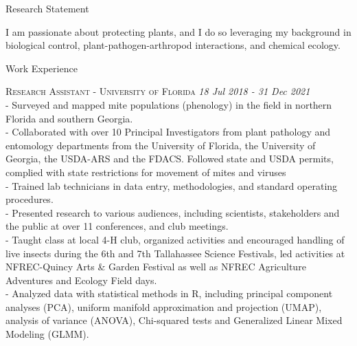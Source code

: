 \documentclass{resume} %
\begin{document}
\begin{rSection}{Research Statement}
	
I am passionate about protecting plants, and I do so leveraging my background in biological control, plant-pathogen-arthropod interactions, and chemical ecology. \end{rSection}

\begin{rSection}{Work Experience}
	
	\textsc{Research Assistant - University of Florida} \hfill {\em \textit{18 Jul 2018 - 31 Dec 2021}}\\
- Surveyed and mapped mite populations (phenology) in the field in northern Florida and southern Georgia.\\
- Collaborated with over 10 Principal Investigators from plant pathology and entomology departments from the University of Florida, the University of Georgia, the USDA-ARS and the FDACS. Followed state and USDA permits, complied with state restrictions for movement of mites and viruses\\
 - Trained lab technicians in data entry, methodologies, and standard operating procedures.\\
 - Presented research to various audiences, including scientists, stakeholders and the public at over 11 conferences, and club meetings.\\
 - Taught class at local 4-H club, organized activities and encouraged handling of live insects during the 6th and 7th Tallahassee Science Festivals, led activities at NFREC-Quincy Arts \& Garden Festival as well as NFREC Agriculture Adventures and Ecology Field days.\\
 -  Analyzed data with statistical methods in R, including principal component analyses (PCA), uniform manifold approximation and projection (UMAP), analysis of variance (ANOVA), Chi-squared tests and Generalized Linear Mixed Modeling (GLMM). \\


\end{rSection}
\end{document}
